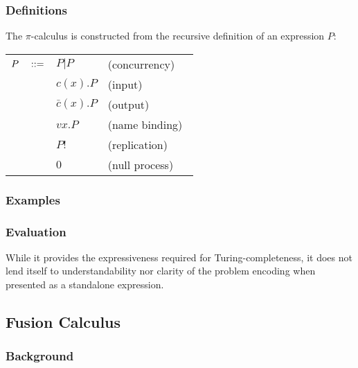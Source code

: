 \documentclass{article}
\begin{document}
        \subsubsection{Definitions}
            The $\pi$-calculus is constructed from the recursive definition of an expression $P$:
            \begin{center} %
                \begin{tabular}{ l l l }
                    $P \quad ::=$    & $P | P$           & (concurrency) \\
                                        & $ c(x).P$         & (input) \\
                                        & $\bar{c}(x).P$    & (output) \\
                                        & $vx.P$            & (name binding)~\footnotemark\\
                                        & $P!$              & (replication)~\footnotemark\\
                                        & $0$               & (null process)
                \end{tabular}
            \end{center}  

        \subsubsection{Examples}


        \subsubsection{Evaluation}
            While it provides the expressiveness required for Turing-completeness, it does not lend itself to understandability nor clarity of the problem encoding when presented as a standalone expression.



    \subsection{Fusion Calculus}

        \subsubsection{Background}
            \cite{fusion-calculus}
\end{document}

